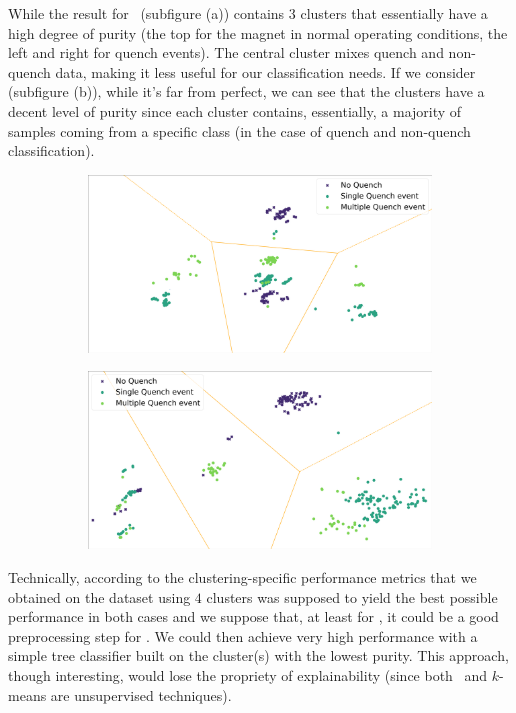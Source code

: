 While the result for \an\ (subfigure (a)) contains $3$ clusters that essentially have a high degree
of purity (the top for the magnet in normal operating conditions, the left and right for quench
events). The central cluster mixes quench and non-quench data, making it less useful for our
classification needs. If we consider \cnmod (subfigure (b)), while it's far from perfect, we can see
that the clusters have a decent level of purity since each cluster contains, essentially, a majority
of samples coming from a specific class (in the case of quench and non-quench classification).
\begin{figure}[!ht]
	\centering
	\begin{subfigure}{0.8\linewidth}
		\centering
		\includegraphics[width=\linewidth]{img/clustering_an_qlp_4c.png}
		\caption{}
	\end{subfigure}
	\begin{subfigure}{0.8\linewidth}
		\centering
		\includegraphics[width=\linewidth]{img/clustering_cnmod_qlp_4c.png}
		\caption{}
	\end{subfigure}
	\caption{} \label{fig:4-means-results}
\end{figure}

Technically, according to the clustering-specific performance metrics that we obtained on the dataset using
$4$ clusters was supposed to yield the best possible performance in both cases and we suppose that,
at least for \cnmod, it could be a good preprocessing step for \qrp. We could then achieve very high
performance with a simple tree classifier built on the cluster(s) with the lowest purity. This
approach, though interesting, would lose the propriety of explainability (since both \pca\ and
$k$-means are unsupervised techniques).

